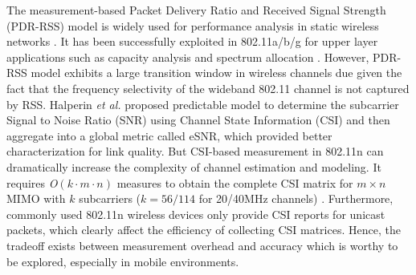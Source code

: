 \documentclass[journal,onecolumn,12pt]{IEEEtran}
\begin{document}
The measurement-based Packet Delivery Ratio and Received Signal Strength (PDR-RSS) model is widely used for performance analysis in static wireless networks \cite{reis2006model}. It has been successfully exploited in 802.11a/b/g for upper layer applications such as capacity analysis \cite{kashyap2007capacity} and spectrum allocation \cite{k.rayanchu:fluid:}. However, PDR-RSS model exhibits a large transition window in wireless channels due given the fact that the frequency selectivity of the wideband 802.11 channel is not captured by RSS. Halperin \textit{et al.} \cite{Halperin2010predictable} proposed predictable model to determine the subcarrier Signal to Noise Ratio (SNR) using Channel State Information (CSI) and then aggregate into a global metric called eSNR, which provided better characterization for link quality. But CSI-based measurement in 802.11n can dramatically increase the complexity of channel estimation and modeling. It requires \textit{O}$(k\cdot m \cdot n)$ measures to obtain the complete CSI matrix for $m \times n$ MIMO with $k$ subcarriers ($k=56/114$ for 20/40MHz channels) \cite{CSI-SF}. Furthermore, commonly used 802.11n wireless devices only provide CSI reports for unicast packets, which clearly affect the efficiency of collecting CSI matrices. Hence, the tradeoff exists between measurement overhead and accuracy which is worthy to be explored, especially in mobile environments.
\end{document}
